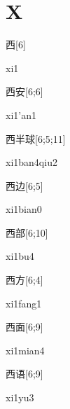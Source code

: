 ﻿%
\section*{X}

\begin{verbete}[xi1]{西}[6]
\begin{pronuncia}{xi1}
\end{pronuncia}
\end{verbete}

\begin{verbete}[xi1'an1]{西安}[6;6]
\begin{pronuncia}{xi1'an1}
\end{pronuncia}
\end{verbete}

\begin{verbete}{西半球}[6;5;11]
\begin{pronuncia}{xi1ban4qiu2}
\end{pronuncia}
\end{verbete}

\begin{verbete}[xi1bian0]{西边}[6;5]
\begin{pronuncia}{xi1bian0}
\end{pronuncia}
\end{verbete}

\begin{verbete}[xi1bu4]{西部}[6;10]
\begin{pronuncia}{xi1bu4}
\end{pronuncia}
\end{verbete}

\begin{verbete}[xi1fang1]{西方}[6;4]
\begin{pronuncia}{xi1fang1}
\end{pronuncia}
\end{verbete}

\begin{verbete}[xi1mian4]{西面}[6;9]
\begin{pronuncia}{xi1mian4}
\end{pronuncia}
\end{verbete}

\begin{verbete}[xi1yu3]{西语}[6;9]
\begin{pronuncia}{xi1yu3}
\end{pronuncia}
\end{verbete}

